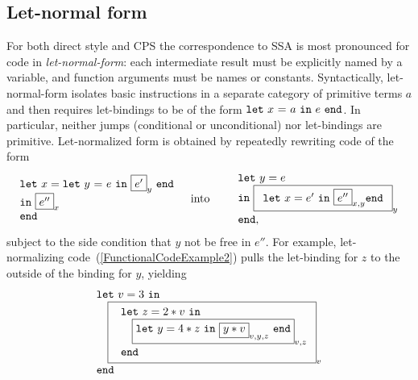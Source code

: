 
\subsection{Let-normal form}
\label{section:Part1:Semantics:LetNormalForm}
For both direct style and CPS the correspondence to SSA is most
pronounced for code in \emph{let-normal-form}: each intermediate
result must be explicitly named by a variable, and function arguments
must be names or constants. Syntactically, let-normal-form isolates
basic instructions in a separate category of primitive terms $a$ and
then requires let-bindings to be of the form $\mathtt{let}\ {x}\ \mathtt{=}\ {a}\ \mathtt{in}\ {e}\ \mathtt{end}$.  In
particular, neither jumps (conditional or unconditional) nor
let-bindings are primitive. Let-normalized form is obtained by
repeatedly rewriting code of the form
\begin{eqnarray*}
 \begin{array}{l}
   \mathtt{let}\ x = \letin y {e} {\fbox{$e'$}_y}\\
   \mathtt{in}\ {\fbox{$e''$}_{x}}\\ 
   \mathtt{end}
  \end{array}
& \quad \textrm{into} \quad &
  \begin{array}{l}
    \mathtt{let}\ y = e\\
    \mathtt{in}\ \fbox{$\begin{array}{l}
                            \mathtt{let}\ x = {e'}\ 
                            \mathtt{in}\ {\fbox{$e''$}_{x,y}}
                            \mathtt{end}
                        \end{array}$}_y\\
    \mathtt{end,}
  \end{array}
\end{eqnarray*}
subject to the side condition that $y$ not be free in $e''$.
For example, let-normalizing code~(\ref{FunctionalCodeExample2}) pulls the
let-binding for $z$ to the outside of the binding for $y$, yielding
\begin{equation}
\label{FunctionalCodeExample4}
\begin{array}{l}
\mathtt{let}\ v = 3\ \mathtt{in}\\
\quad 
  {\fbox{
   $\begin{array}[t]{l} 
     \mathtt{let}\ z=2*v \ \mathtt{in}\\
     \quad {\fbox{$\mathtt{let}\ y = 4*z\ \mathtt{in}\ 
                 \fbox{$y*v$}_{v,y,z}\ \mathtt{end}$}_{v,z}}\\
     \mathtt{end}
   \end{array}$}_{v}}\\
\mathtt{end}
\end{array}
\end{equation}

